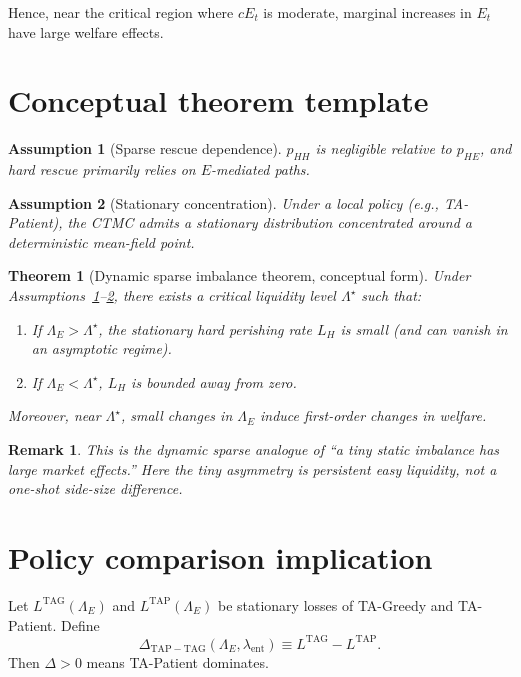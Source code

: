 \documentclass{article}
\newtheorem{assumption}{Assumption}
\newtheorem{theorem}{Theorem}
\newtheorem{remark}{Remark}
\begin{document}
Hence, near the critical region where \(cE_t\) is moderate, marginal increases in \(E_t\) have large welfare effects.

\section{Conceptual theorem template}

\begin{assumption}[Sparse rescue dependence]
\label{ass:sparse}
\(p_{HH}\) is negligible relative to \(p_{HE}\), and hard rescue primarily relies on \(E\)-mediated paths.
\end{assumption}

\begin{assumption}[Stationary concentration]
\label{ass:stationary}
Under a local policy (e.g., TA-Patient), the CTMC admits a stationary distribution concentrated around a deterministic mean-field point.
\end{assumption}

\begin{theorem}[Dynamic sparse imbalance theorem, conceptual form]
\label{thm:conceptual}
Under Assumptions~\ref{ass:sparse}--\ref{ass:stationary}, there exists a critical liquidity level \(\Lambda^\star\) such that:
\begin{enumerate}
  \item If \(\Lambda_E>\Lambda^\star\), the stationary hard perishing rate \(L_H\) is small (and can vanish in an asymptotic regime).
  \item If \(\Lambda_E<\Lambda^\star\), \(L_H\) is bounded away from zero.
\end{enumerate}
Moreover, near \(\Lambda^\star\), small changes in \(\Lambda_E\) induce first-order changes in welfare.
\end{theorem}

\begin{remark}
This is the dynamic sparse analogue of ``a tiny static imbalance has large market effects.'' Here the tiny asymmetry is persistent easy liquidity, not a one-shot side-size difference.
\end{remark}

\section{Policy comparison implication}

Let \(L^{\mathrm{TAG}}(\Lambda_E)\) and \(L^{\mathrm{TAP}}(\Lambda_E)\) be stationary losses of TA-Greedy and TA-Patient. Define
\[
\Delta_{\mathrm{TAP}\!-\!\mathrm{TAG}}(\Lambda_E,\lambda_{\mathrm{ent}})
\equiv L^{\mathrm{TAG}}-L^{\mathrm{TAP}}.
\]
Then \(\Delta>0\) means TA-Patient dominates.
\end{document}
